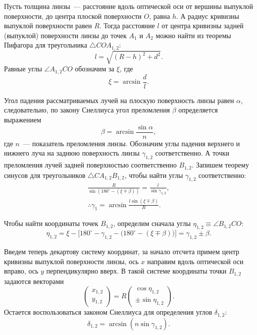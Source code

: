 Пусть толщина линзы~--- расстояние вдоль оптической оси от вершины выпуклой поверхности, до центра плоской поверхности $O$, равна $h$. А радиус кривизны выпуклой поверхности равен $R$. Тогда расстояние $l$ от центра кривизны задней (выпуклой) поверхности линзы до точек $A_1$ и $A_2$ можно найти из теоремы Пифагора для треугольника $\triangle COA_{1,2}$:
\begin{equation*}
	l = \sqrt{(R - h)^2 + d^2}.
\end{equation*}
Равные углы $\angle A_{1,2} C O$ обозначим за $\xi$, где
\begin{equation*}
	\xi = \arcsin \frac{d}{l}.
\end{equation*}

Угол падения рассматриваемых лучей на плоскую поверхность линзы равен $\alpha$, следовательно, по закону Снеллиуса угол преломления $\beta$ определяется выражением
\begin{equation*}
	\beta = \arcsin \frac{\sin \alpha}{n},
\end{equation*}
где $n$~--- показатель преломления линзы. Обозначим углы падения верхнего и нижнего луча на заднюю поверхность линзы $\gamma_{1,2}$ соответственно. А точки преломления лучей задней поверхностью соответственно $B_{1,2}$. Запишем теорему синусов для треугольников $\triangle C A_{1,2} B_{1,2}$, чтобы найти углы $\gamma_{1,2}$ соответственно:
\begin{gather*}
	\frac{R}{\sin (180^\circ - (\xi \mp \beta))} = \frac{l}{\sin \gamma_{1,2}},\\
	\therefore \gamma_1 = \arcsin \frac{l\sin (\xi \mp \beta)}{R}.
\end{gather*}

Чтобы найти координаты точек $B_{1,2}$, определим сначала углы $ \eta_{1,2} \equiv \angle B_{1,2} C O$:
\begin{equation*}
	\eta_{1,2} = \xi - \Big[180^\circ - \gamma_{1,2} - \big(180^\circ - \left(\xi \mp \beta\right)\big)\Big] = \gamma_{1,2} \pm \beta.
\end{equation*}

Введем теперь декартову систему координат, за начало отсчета примем центр кривизны выпуклой поверхности линзы, ось $x$ направим вдоль оптической оси вправо, ось $y$ перпендикулярно вверх. В такой системе координаты точки $B_{1,2}$ задаются векторами
\begin{equation*}
	\begin{pmatrix}
		x_{1,2}\\
		y_{1,2}
	\end{pmatrix}
	= R
	\begin{pmatrix}
		\cos \eta_{1,2}\\
		\pm \sin \eta_{1,2}
	\end{pmatrix}.
\end{equation*}
Остается воспользоваться законом Снеллиуса для определения углов $\delta_{1,2}$:
\begin{equation*}
	\delta_{1,2} = \arcsin \left( n \sin \gamma_{1,2} \right).
\end{equation*}

